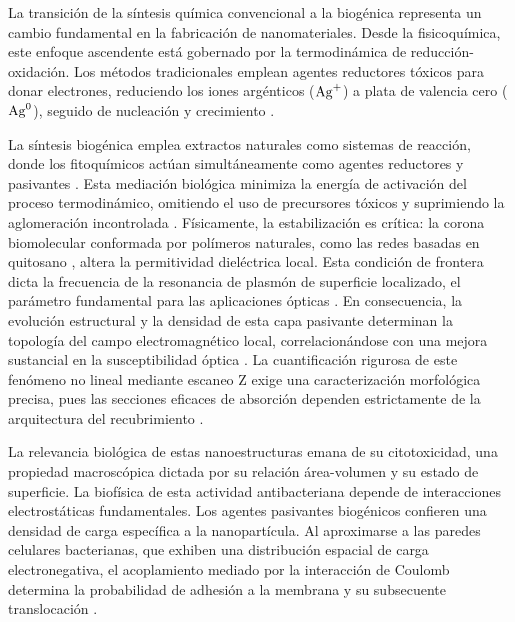 La transición de la síntesis química convencional a la biogénica representa un
cambio fundamental en la fabricación de nanomateriales. Desde la fisicoquímica,
este enfoque ascendente está gobernado por la termodinámica de
reducción-oxidación. Los métodos tradicionales emplean agentes reductores
tóxicos para donar electrones, reduciendo los iones argénticos ($\ce{Ag^+}$) a plata
de valencia cero ($\ce{Ag^0}$), seguido de nucleación y crecimiento
\cite{hosnyComprehensiveReviewSilver2025, lasmiSilverNanoparticlesAgNPs2025}.

La síntesis biogénica emplea extractos naturales como sistemas de reacción,
donde los fitoquímicos actúan simultáneamente como agentes reductores y
pasivantes \cite{thomasPlantbasedSynthesisCharacterization2024,
rupanshiBiogenicSilverNanoparticles2025}. Esta mediación biológica minimiza
la energía de activación del proceso termodinámico, omitiendo el uso de
precursores tóxicos y suprimiendo la aglomeración incontrolada
\cite{nagimeMoringaOleiferaPlethora2024}. Físicamente, la estabilización
es crítica: la corona biomolecular conformada por polímeros naturales, como
las redes basadas en quitosano \cite{voChitosanbasedStabilizersAqueous2025},
altera la permitividad dieléctrica local. Esta condición de frontera dicta la
frecuencia de la resonancia de plasmón de superficie localizado, el parámetro
fundamental para las aplicaciones ópticas
\cite{satiSilverNanoparticlesAgNPs2025}. En consecuencia, la evolución
estructural y la densidad de esta capa pasivante determinan la topología del
campo electromagnético local, correlacionándose con una mejora sustancial en
la susceptibilidad óptica \cite{elhendawiEnhancementStructureLinear2025}.
La cuantificación rigurosa de este fenómeno no lineal mediante escaneo Z
exige una caracterización morfológica precisa, pues las secciones eficaces
de absorción dependen estrictamente de la arquitectura del recubrimiento
\cite{al-jumailyCharacterizationNonlinearOptical2025,
kocSilverNanoparticlesAgNPs2026}.

La relevancia biológica de estas nanoestructuras emana de su citotoxicidad,
una propiedad macroscópica dictada por su relación área-volumen y su estado
de superficie. La biofísica de esta actividad antibacteriana depende de
interacciones electrostáticas fundamentales. Los agentes pasivantes
biogénicos confieren una densidad de carga específica a la nanopartícula.
Al aproximarse a las paredes celulares bacterianas, que exhiben una
distribución espacial de carga electronegativa, el acoplamiento mediado por
la interacción de Coulomb determina la probabilidad de adhesión a la membrana
y su subsecuente translocación \cite{hosnyComprehensiveReviewSilver2025,
kannaiahAntibacterialCytotoxicEffect2026}.

